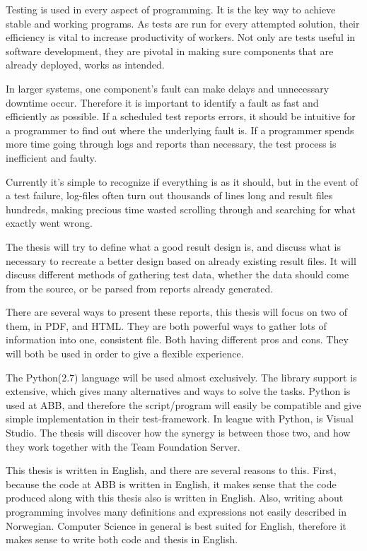 \documentclass{article}
\begin{document}
	
	Testing is used in every aspect of programming. It is the key way to achieve stable and working programs. 
	As tests are run for every attempted solution, their efficiency is vital to increase productivity of workers. Not only are tests useful in software development, they are pivotal in making sure components that are already deployed, works as intended. 
	
	In larger systems, one component's fault can make delays and unnecessary downtime occur. Therefore it is important to identify a fault as fast and efficiently as possible. If a scheduled test reports errors, it should be intuitive for a programmer to find out where the underlying fault is. If a programmer spends more time going through logs and reports than necessary, the test process is inefficient and faulty. 
	
	Currently it's simple to recognize if everything is as it should, but in the event of a test failure, log-files often turn out thousands of lines long and result files hundreds, making precious time wasted scrolling through and searching for what exactly went wrong.
	
	The thesis will try to define what a good result design is, and discuss what is necessary to recreate a better design based on already existing result files. It will discuss different methods of gathering test data, whether the data should come from the source, or be parsed from reports already generated. 
	
	There are several ways to present these reports, this thesis will focus on two of them, in PDF, and HTML. They are both powerful ways to gather lots of information into one, consistent file. Both having different pros and cons. They will both be used in order to give a flexible experience. 
	
	The Python(2.7) language will be used almost exclusively. The library support is extensive, which gives many alternatives and ways to solve the tasks. Python is used at ABB, and therefore the script/program will easily be compatible and give simple implementation in their test-framework. In league with Python, is Visual Studio. The thesis will discover how the synergy is between those two, and how they work together with the Team Foundation Server.
	
	This thesis is written in English, and there are several reasons to this. First, because the code at ABB is written in English, it makes sense that the code produced along with this thesis also is written in English. Also, writing about programming involves many definitions and expressions not easily described in Norwegian. Computer Science in general is best suited for English, therefore it makes sense to write both code and thesis in English.
	
\end{document}
